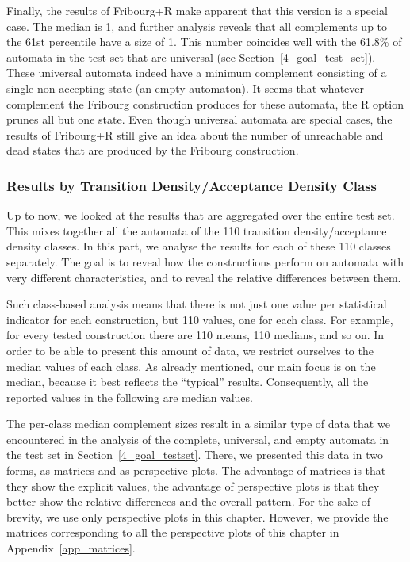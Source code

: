 Finally, the results of Fribourg+R make apparent that this version is a special case. The median is 1, and further analysis reveals that all complements up to the 61st percentile have a size of 1. This number coincides well with the 61.8\% of automata in the \goal{} test set that are universal (see Section~\ref{4_goal_test_set}). These universal automata indeed have a minimum complement consisting of a single non-accepting state (an empty automaton). It seems that whatever complement the Fribourg construction produces for these automata, the R option prunes all but one state. Even though universal automata are special cases, the results of Fribourg+R still give an idea about the number of unreachable and dead states that are produced by the Fribourg construction.

\subsubsection{Results by Transition Density/Acceptance Density Class}
Up to now, we looked at the results that are aggregated over the entire test set. This mixes together all the automata of the 110 transition density/acceptance density classes. In this part, we analyse the results for each of these 110 classes separately. The goal is to reveal how the constructions perform on automata with very different characteristics, and to reveal the relative differences between them.

Such class-based analysis means that there is not just one value per statistical indicator for each construction, but 110 values, one for each class. For example, for every tested construction there are 110 means, 110 medians, and so on. In order to be able to present this amount of data, we restrict ourselves to the median values of each class. As already mentioned, our main focus is on the median, because it best reflects the ``typical'' results. Consequently, all the reported values in the following are median values. 

The per-class median complement sizes result in a similar type of data that we encountered in the analysis of the complete, universal, and empty automata in the \goal{} test set in Section~\ref{4_goal_testset}. There, we presented this data in two forms, as matrices and as perspective plots. The advantage of matrices is that they show the explicit values, the advantage of perspective plots is that they better show the relative differences and the overall pattern. For the sake of brevity, we use only perspective plots in this chapter. However, we provide the matrices corresponding to all the perspective plots of this chapter in Appendix~\ref{app_matrices}.

